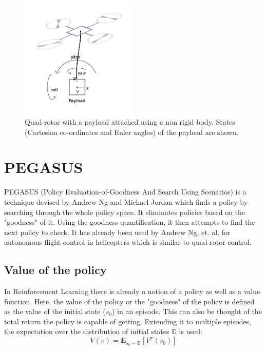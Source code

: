 \documentclass[hidelinks,BTech]{iitmdiss}
\begin{document}
\begin{figure}[H]
  \centering
    \includegraphics[width=0.5\textwidth]{payload.png}
    \caption{Quad-rotor with a payload attached using a non rigid body. States (Cartesian co-ordinates and Euler angles) of the payload are shown.}
\end{figure}


\chapter{PEGASUS}

PEGASUS \cite{PEGASUS} (Policy Evaluation-of-Goodness And Search Using Scenarios) is a technique devised by Andrew Ng and Michael Jordan which finds a policy by searching through the whole policy space. It eliminates policies based on the "goodness" of it. Using the goodness quantification, it then attempts to find the next policy to check. It has already been used by Andrew Ng, et. al. for autonomous flight control in helicopters \cite{HelicopterPegasus} which is similar to quad-rotor control.

\section{Value of the policy}

In Reinforcement Learning there is already a notion of a policy as well as a value function. Here, the value of the policy or the "goodness" of the policy is defined as the value of the initial state ($s_{0}$) in an episode. This can also be thought of the total return the policy is capable of getting. Extending it to multiple episodes, the expectation over the distribution of initial states $\mathbb{D}$ is used:
\begin{equation}
  V(\pi) = \mathbf{E}_{s_{0} \sim \mathbb{D}} [ V^{\pi} (s_{0})]
\end{equation}
\end{document}
